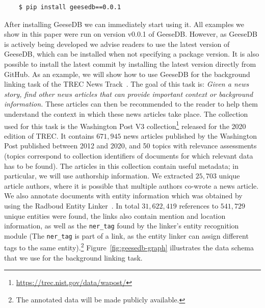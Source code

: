 \begin{verbatim}
	$ pip install geesedb==0.0.1
\end{verbatim}
After installing GeeseDB we can immediately start using it. All examples we show in this paper were run on version v0.0.1 of GeeseDB. However, as GeeseDB is actively being developed we advise readers to use the latest version of GeeseDB, which can be installed when not specifying a package version. It is also possible to install the latest commit by installing the latest version directly from GitHub.
As an example, we will show how to use GeeseDB for the background linking task of the TREC News Track~\cite{soboroff2018trec}. The goal of this task is: \textit{Given a news story, find other news articles that can provide important context or background information.} These articles can then be recommended to the reader to help them understand the context in which these news articles take place. The collection used for this task is the Washington Post V3 collection\footnote{\url{https://trec.nist.gov/data/wapost/}} released for the 2020 edition of TREC. It contains $671,945$ news articles published by the Washington Post published between 2012 and 2020, and 50 topics with relevance assessments (topics correspond to collection identifiers of documents for which relevant data has to be found). The articles in this collection contain useful metadata; in particular, we will use authorship information. We extracted $25,703$ unique article authors, where it is possible that multiple authors co-wrote a news article. We also annotate documents with entity information which was obtained by using the Radboud Entity Linker~\cite{REL}. In total $31,622,419$ references to $541,729$ unique entities were found, the links also contain mention and location information, as well as the \texttt{ner\_tag} found by the linker's entity recognition module (The \texttt{ner\_tag} is part of a link, as the entity linker can assign different tags to the same entity).\footnote{The annotated data will be made publicly available.} Figure~\ref{fig:geesedb-graph} illustrates the data schema that we use for the background linking task. 

